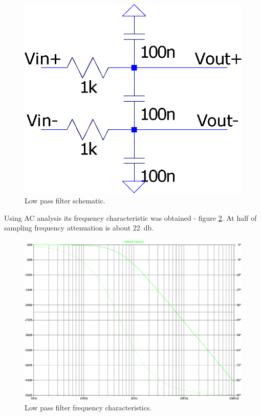         \begin{figure}[H]
            \centering
            \includegraphics[width=0.3\paperwidth]{img/06/low_pass_filter.eps}
            \caption{Low pass filter schematic.}
            \label{low_pass_filter}
        \end{figure}

        Using AC analysis its frequency characteristic was obtained - figure \ref{low_pass_filter_output}. At half of sampling frequency attenuation is about \SI{22}{\decibel}.

        \begin{figure}[H]
            \centering
            \includegraphics[width=0.7\paperwidth]{img/06/low_pass_filter_output.eps}
            \caption{Low pass filter frequency characteristics.}
            \label{low_pass_filter_output}
        \end{figure}

